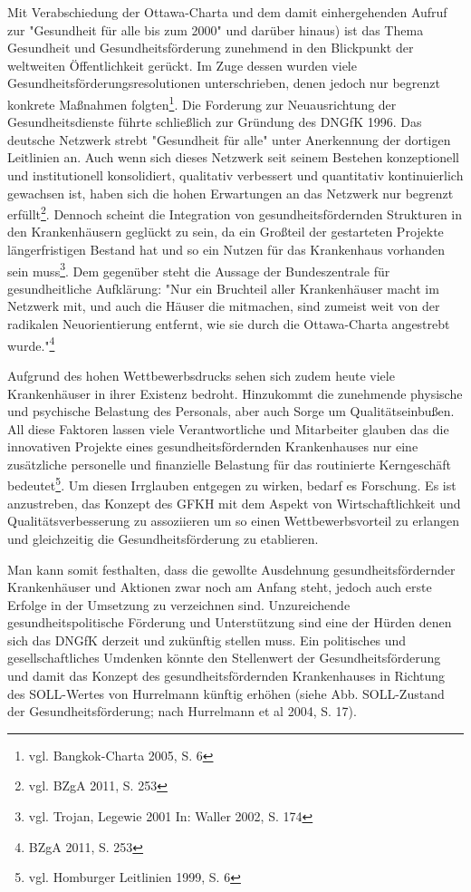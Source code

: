 Mit Verabschiedung der Ottawa-Charta und dem damit einhergehenden Aufruf zur "Gesundheit für alle bis zum 2000" und darüber hinaus) ist das Thema Gesundheit und Gesundheitsförderung zunehmend in den Blickpunkt der weltweiten Öffentlichkeit gerückt. Im Zuge dessen wurden viele Gesundheitsförderungsresolutionen unterschrieben, denen jedoch nur begrenzt konkrete Maßnahmen folgten\footnote{vgl. Bangkok-Charta 2005, S. 6}. Die Forderung zur Neuausrichtung der Gesundheitsdienste führte schließlich zur Gründung des DNGfK 1996. Das deutsche Netzwerk strebt "Gesundheit für alle" unter Anerkennung der dortigen Leitlinien an. Auch wenn sich dieses Netzwerk seit seinem Bestehen konzeptionell und institutionell konsolidiert, qualitativ verbessert und quantitativ kontinuierlich gewachsen ist, haben sich die hohen Erwartungen an das Netzwerk nur begrenzt erfüllt\footnote{vgl. BZgA 2011, S. 253}. Dennoch scheint die Integration von gesundheitsfördernden Strukturen in den Krankenhäusern geglückt zu sein, da ein Großteil der gestarteten Projekte längerfristigen Bestand hat und so ein Nutzen für das Krankenhaus vorhanden sein muss\footnote{vgl. Trojan, Legewie 2001 In: Waller 2002, S. 174}. Dem gegenüber steht die Aussage der Bundeszentrale für gesundheitliche Aufklärung: "Nur ein Bruchteil aller Krankenhäuser macht im Netzwerk mit, und auch die Häuser die mitmachen, sind zumeist weit von der radikalen Neuorientierung entfernt, wie sie durch die Ottawa-Charta angestrebt wurde."\footnote{BZgA 2011, S. 253}

Aufgrund des hohen Wettbewerbsdrucks sehen sich zudem heute viele Krankenhäuser in ihrer Existenz bedroht. Hinzukommt die zunehmende physische und psychische Belastung des Personals, aber auch Sorge um Qualitätseinbußen. All diese Faktoren lassen viele Verantwortliche und Mitarbeiter glauben das die innovativen Projekte eines gesundheitsfördernden Krankenhauses nur eine zusätzliche personelle und finanzielle Belastung für das routinierte Kerngeschäft bedeutet\footnote{vgl. Homburger Leitlinien 1999, S. 6}. Um diesen Irrglauben entgegen zu wirken, bedarf es Forschung. Es ist anzustreben, das Konzept des GFKH mit dem Aspekt von Wirtschaftlichkeit und Qualitätsverbesserung zu assoziieren um so einen Wettbewerbsvorteil zu erlangen und gleichzeitig die Gesundheitsförderung zu etablieren.

Man kann somit festhalten, dass die gewollte Ausdehnung gesundheitsfördernder Krankenhäuser und Aktionen zwar noch am Anfang steht, jedoch auch erste Erfolge in der Umsetzung zu verzeichnen sind. Unzureichende gesundheitspolitische Förderung und Unterstützung sind eine der Hürden denen sich das DNGfK derzeit und zukünftig stellen muss. Ein politisches und gesellschaftliches Umdenken könnte den Stellenwert der Gesundheitsförderung und damit das Konzept des gesundheitsfördernden Krankenhauses in Richtung des SOLL-Wertes von Hurrelmann künftig erhöhen (siehe Abb. SOLL-Zustand der Gesundheitsförderung; nach Hurrelmann et al 2004, S. 17).

